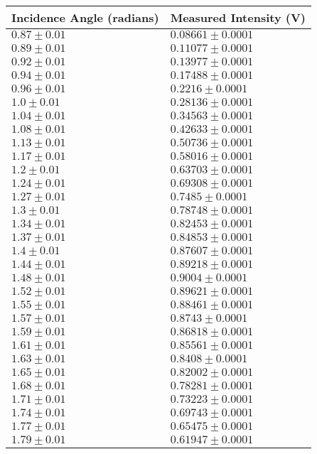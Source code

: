 \begin{tabular}{| p{} | p{} |}
\hline
Incidence Angle (radians) & Measured Intensity (V)\\
\hline
$0.87 \pm 0.01$ & $0.08661 \pm 0.0001$\\
$0.89 \pm 0.01$ & $0.11077 \pm 0.0001$\\
$0.92 \pm 0.01$ & $0.13977 \pm 0.0001$\\
$0.94 \pm 0.01$ & $0.17488 \pm 0.0001$\\
$0.96 \pm 0.01$ & $0.2216 \pm 0.0001$\\
$1.0 \pm 0.01$ & $0.28136 \pm 0.0001$\\
$1.04 \pm 0.01$ & $0.34563 \pm 0.0001$\\
$1.08 \pm 0.01$ & $0.42633 \pm 0.0001$\\
$1.13 \pm 0.01$ & $0.50736 \pm 0.0001$\\
$1.17 \pm 0.01$ & $0.58016 \pm 0.0001$\\
$1.2 \pm 0.01$ & $0.63703 \pm 0.0001$\\
$1.24 \pm 0.01$ & $0.69308 \pm 0.0001$\\
$1.27 \pm 0.01$ & $0.7485 \pm 0.0001$\\
$1.3 \pm 0.01$ & $0.78748 \pm 0.0001$\\
$1.34 \pm 0.01$ & $0.82453 \pm 0.0001$\\
$1.37 \pm 0.01$ & $0.84853 \pm 0.0001$\\
$1.4 \pm 0.01$ & $0.87607 \pm 0.0001$\\
$1.44 \pm 0.01$ & $0.89218 \pm 0.0001$\\
$1.48 \pm 0.01$ & $0.9004 \pm 0.0001$\\
$1.52 \pm 0.01$ & $0.89621 \pm 0.0001$\\
$1.55 \pm 0.01$ & $0.88461 \pm 0.0001$\\
$1.57 \pm 0.01$ & $0.8743 \pm 0.0001$\\
$1.59 \pm 0.01$ & $0.86818 \pm 0.0001$\\
$1.61 \pm 0.01$ & $0.85561 \pm 0.0001$\\
$1.63 \pm 0.01$ & $0.8408 \pm 0.0001$\\
$1.65 \pm 0.01$ & $0.82002 \pm 0.0001$\\
$1.68 \pm 0.01$ & $0.78281 \pm 0.0001$\\
$1.71 \pm 0.01$ & $0.73223 \pm 0.0001$\\
$1.74 \pm 0.01$ & $0.69743 \pm 0.0001$\\
$1.77 \pm 0.01$ & $0.65475 \pm 0.0001$\\
$1.79 \pm 0.01$ & $0.61947 \pm 0.0001$\\
\hline
\end{tabular}\\
